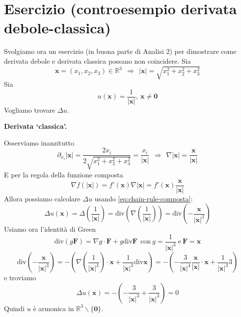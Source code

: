 \documentclass[10pt,a4paper,twoside,openright]{book}
\newcommand{\x}{\mathbf{x}}
\begin{document}
\section{Esercizio (controesempio derivata debole-classica)}

Svolgiamo ora un esercizio (in buona parte di Analisi 2) per dimostrare come derivata debole e derivata classica possano non coincidere. Sia
\begin{equation*}
	\x =( x_{1} ,x_{2} ,x_{3}) \in \mathbb{R}^{3} \ \ \Rightarrow \ \ | \x| =\sqrt{x^{2}_{1} +x^{2}_{2} +x^{2}_{3}}
\end{equation*}
Sia 
\begin{equation*}
	u(\x) =\frac{1}{| \x| } ,\ \x \neq \mathbf{0}
\end{equation*}
Vogliamo trovare $\displaystyle \Delta u$.



\textbf{Derivata `classica'.}

Osserviamo inanzitutto 
\begin{equation*}
	\partial _{x_{i}}| \x| =\frac{2x_{i}}{2\sqrt{x^{2}_{1} +x^{2}_{2} +x^{2}_{3}}} =\frac{x_{i}}{| \x| } \ \ \Rightarrow \ \ \nabla | \x| =\frac{\x}{| \x| }
\end{equation*}
E per la regola della funzione composta
\begin{equation}
	\nabla f(| \x| ) =f'(\x) \nabla | \x| =f'(\x)\frac{\x}{| \x| }
	\label{eq:chain-rule-composta}
\end{equation}
Allora possiamo calcolare $\displaystyle \Delta u$ usando \eqref{eq:chain-rule-composta}:
\begin{equation*}
	\Delta u(\x) =\Delta \left(\frac{1}{| \x| }\right) =\mathrm{div}\left( \nabla \left(\frac{1}{| \x| }\right)\right) =\mathrm{div}\left( -\frac{\x}{| \x| ^{3}}\right)
\end{equation*}
Usiamo ora l'identità di Green 
\begin{equation*}
	\mathrm{div}( g\mathbf{F}) =\nabla g\cdotp \mathbf{F} +g\mathrm{div}\mathbf{F} \ \ \text{con} \ g=\frac{1}{| \x| ^{3}} \ \text{e} \ \mathbf{F} =\x
\end{equation*}
\begin{equation*}
	\mathrm{div}\left( -\frac{\x}{| \x| ^{3}}\right) =-\left( \nabla \left(\frac{1}{| \x| ^{3}}\right) \cdotp \x +\frac{1}{| \x| ^{3}}\mathrm{div}\x\right) =-\left( -\frac{3}{| \x| ^{4}}\frac{\x}{| \x| } \cdotp \x +\frac{1}{| \x| ^{3}} 3\right)
\end{equation*}
e troviamo
\begin{equation*}
	\Delta u(\x) =-\left( -\frac{3}{| \x| ^{3}} +\frac{3}{| \x| ^{3}}\right) =0
\end{equation*}
Quindi $\displaystyle u$ è armonica in $\displaystyle \mathbb{R}^{3} \backslash \{\mathbf{0}\}$.
\end{document}
